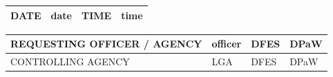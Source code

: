 \documentclass[10pt,a4paper,final]{report}
\begin{document}
\begin{table}[ht]
\vspace{-0.1em}
\begin{tabular}{|m{2cm}|m{6.8cm}|m{2cm}|m{6.8cm}|}
\hline
DATE & {{date}} & TIME & {{time}} \\
\hline
\end{tabular}

\vspace{-0.1em}
\begin{tabular}{|m{9.2cm}|m{5cm}|C{1.7cm}|C{1.7cm}|}
REQUESTING OFFICER / AGENCY & {{officer}} & DFES & DPaW \\
\hline
CONTROLLING AGENCY & LGA & DFES & DPaW \\
\hline
\end{tabular}

\vspace{-0.2em}


\end{table}
\end{document}
